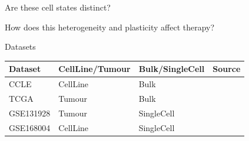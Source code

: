 \documentclass[aspectratio=169,9pt]{beamer}
\begin{document}
    \begin{frame}[standout]
        Are these cell states distinct?
        
        \pause How does this heterogeneity and plasticity affect therapy?
    \end{frame}

    \begin{frame}{Datasets}
    \begin{table}[]
        \centering
        \begin{tabular}{|l|l|l|l|}
            \hline
            \textbf{Dataset} & \textbf{CellLine/Tumour} & \textbf{Bulk/SingleCell} & \textbf{Source}\\ \hline
            CCLE             & CellLine                 & Bulk                     & \cite{CCLE}\\ \hline
            TCGA             & Tumour                   & Bulk                     & \cite{TCGA-GBM}\\ \hline
            GSE131928        & Tumour                   & SingleCell               & \cite{Neftel}  \\ \hline
            GSE168004        & CellLine                 & SingleCell               & \cite{scCL_GBM}\\ \hline
            \end{tabular}
    \end{table}
    \end{frame}
\end{document}
